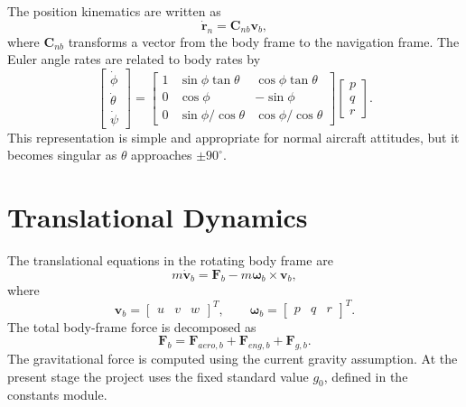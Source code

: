 The position kinematics are written as
\begin{equation}
    \dot{\bm{r}}_n = \bm{C}_{nb}\bm{v}_b,
\end{equation}
where $\bm{C}_{nb}$ transforms a vector from the body frame to the navigation frame. The Euler angle rates are related to body rates by
\begin{equation}
    \begin{bmatrix}
        \dot{\phi} \\ \dot{\theta} \\ \dot{\psi}
    \end{bmatrix}
    =
    \begin{bmatrix}
        1 & \sin\phi \tan\theta & \cos\phi \tan\theta \\
        0 & \cos\phi & -\sin\phi \\
        0 & \sin\phi/\cos\theta & \cos\phi/\cos\theta
    \end{bmatrix}
    \begin{bmatrix}
        p \\ q \\ r
    \end{bmatrix}.
\end{equation}
This representation is simple and appropriate for normal aircraft attitudes, but it becomes singular as $\theta$ approaches $\pm 90^\circ$.

\section{Translational Dynamics}

The translational equations in the rotating body frame are
\begin{equation}
    m\dot{\bm{v}}_b = \bm{F}_b - m\bm{\omega}_b \times \bm{v}_b,
\end{equation}
where
\begin{equation}
    \bm{v}_b =
    \begin{bmatrix} u & v & w \end{bmatrix}^{T},
    \qquad
    \bm{\omega}_b =
    \begin{bmatrix} p & q & r \end{bmatrix}^{T}.
\end{equation}
The total body-frame force is decomposed as
\begin{equation}
    \bm{F}_b = \bm{F}_{aero,b} + \bm{F}_{eng,b} + \bm{F}_{g,b}.
\end{equation}
The gravitational force is computed using the current gravity assumption. At the present stage the project uses the fixed standard value $g_0$, defined in the constants module.

